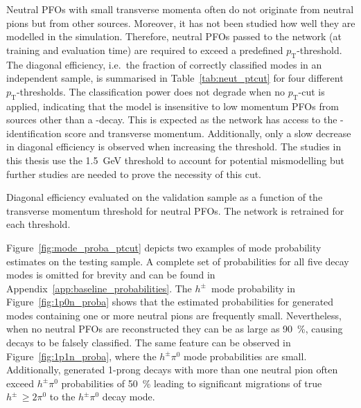 Neutral PFOs with small transverse momenta often do not originate from neutral
pions but from other sources. Moreover, it has not been studied how well they
are modelled in the simulation. Therefore, neutral PFOs passed to the network
(at training and evaluation time) are required to exceed a predefined
$p_\text{T}$-threshold. The diagonal efficiency, i.e.\ the fraction of correctly
classified modes in an independent sample, is summarised in
Table~\ref{tab:neut_ptcut} for four different $p_\text{T}$-thresholds. The
classification power does not degrade when no $p_\text{T}$-cut is applied,
indicating that the model is insensitive to low momentum PFOs from sources other
than a -decay. This is expected as the network has access to the
-identification score and transverse momentum. Additionally, only
a slow decrease in diagonal efficiency is observed when increasing the
threshold. The studies in this thesis use the \SI{1.5}{\giga\electronvolt}
threshold to account for potential mismodelling but further studies are needed
to prove the necessity of this cut.

\begin{table}[htb]
  \centering
  {\small}
  \caption{Diagonal efficiency evaluated on the validation sample as a function
    of the transverse momentum threshold for neutral PFOs. The network is
    retrained for each threshold.}
  \label{tab:neut_ptcut}
\end{table}

Figure~\ref{fig:mode_proba_ptcut} depicts two examples of mode probability
estimates on the testing sample. A complete set of probabilities for all five
decay modes is omitted for brevity and can be found in
Appendix~\ref{app:baseline_probabilities}. The $h^\pm$~mode probability in
Figure~\ref{fig:1p0n_proba} shows that the estimated probabilities for generated
modes containing one or more neutral pions are frequently small. Nevertheless,
when no neutral PFOs are reconstructed they can be as large as
\SI{90}{\percent}, causing decays to be falsely classified. The same feature can
be observed in Figure~\ref{fig:1p1n_proba}, where the $h^\pm \pi^0$ mode
probabilities are small. Additionally, generated 1-prong decays with more than
one neutral pion often exceed $h^\pm \pi^0$ probabilities of \SI{50}{\percent}
leading to significant migrations of true $h^\pm \, {\geq} 2 \pi^0$ to the
$h^\pm \pi^0$ decay mode.

